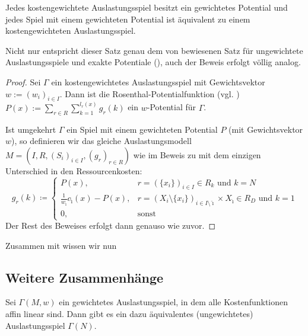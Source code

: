 \begin{satz}
	Jedes kostengewichtete Auslastungsspiel besitzt ein gewichtetes Potential und jedes Spiel mit einem gewichteten Potential ist äquivalent zu einem kostengewichteten Auslastungsspiel.
\end{satz}

Nicht nur entspricht dieser Satz genau dem von \citeauthor{MonShap} bewiesenen Satz für ungewichtete Auslastungsspiele und exakte Potentiale (), auch der Beweis erfolgt völlig analog. 

\begin{proof}
	Sei $\Gamma$ ein kostengewichtetes Auslastungsspiel mit Gewichtsvektor $w := (w_i)_{i\in I}$. Dann ist die Rosenthal-Potentialfunktion (vgl. \cite{RosenthalPotential}) $P(x) := \sum_{r \in R}\sum_{k=1}^{l_r(x)}g_r(k)$ ein $w$-Potential für $\Gamma$.
		
	Ist umgekehrt $\Gamma$ ein Spiel mit einem gewichteten Potential $P$ (mit Gewichtsvektor $w$), so definieren wir das gleiche Auslastungsmodell $M = (I, R, (S_i)_{i \in I}, (g_r)_{r \in R})$ wie im Beweis zu  mit dem einzigen Unterschied in den Ressourcenkosten:
		\[g_r(k) \coloneqq 
		\begin{cases}
		P(x), 									&r = \left(\{x_i\}\right)_{i \in I} \in R_k 													\text{ und } k=N \\
		\frac{1}{w_{\hat{\imath}}}c_{\hat{\imath}}(x) - P(x), 	&r = \left(X_i\setminus\{x_i\}\right)_{i \in I\setminus\hat{\imath}} \times X_{\hat{\imath}} \in R_D 	\text{ und } k=1 \\
		0,										&\text{sonst}
		\end{cases}\]
	Der Rest des Beweises erfolgt dann genauso wie zuvor.
\end{proof}

Zusammen mit  wissen wir nun 


\subsection{Weitere Zusammenhänge}


\begin{satz}
	Sei $\Gamma(M,w)$ ein gewichtetes Auslastungsspiel, in dem alle Kostenfunktionen affin linear sind. Dann gibt es ein dazu äquivalentes (ungewichtetes) Auslastungsspiel $\Gamma(N)$. 
\end{satz}

